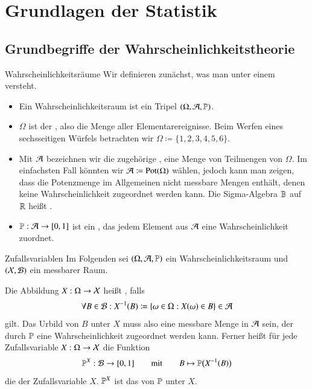 \section{Grundlagen der Statistik}

\divider

\subsection{Grundbegriffe der Wahrscheinlichkeitstheorie}

\begin{frame}{Wahrscheinlichkeitsräume}{}
	Wir definieren zunächst, was man unter einem  versteht.
	\begin{itemize}
		\item Ein Wahrscheinlichkeitsraum ist ein Tripel $(\Omega, \mathcal{A}, \mathbb{P})$.
		\item $\Omega$ ist der , also die Menge aller Elementarereignisse.
			Beim Werfen eines sechsseitigen Würfels betrachten wir $\Omega \coloneqq \{ 1, 2, 3, 4, 5, 6 \}$.
		\item Mit $\mathcal{A}$ bezeichnen wir die zugehörige , eine Menge von Teilmengen von $\Omega$.
			Im einfachsten Fall könnten wir $\mathcal{A} \coloneqq \text{Pot}(\Omega)$ wählen, jedoch kann man zeigen,
			dass die Potenzmenge im Allgemeinen nicht messbare Mengen enthält,
			denen keine Wahrscheinlichkeit zugeordnet werden kann. Die Sigma-Algebra $\mathbb{B}$ auf $\mathbb{R}$ heißt
			.
		\item $\mathbb{P} : \mathcal{A} \rightarrow [0, 1]$ ist ein ,
			das jedem Element aus $\mathcal{A}$ eine Wahrscheinlichkeit zuordnet.
	\end{itemize}
\end{frame}


\begin{frame}{Zufallsvariablen}{}
	Im Folgenden sei $(\Omega, \mathcal{A}, \mathbb{P})$ ein Wahrscheinlichkeitsraum und $(\mathcal{X}, \mathcal{B})$ ein messbarer Raum.
	
	\begin{mydef}
		Die Abbildung $X : \Omega \rightarrow \mathcal{X}$ heißt , falls
		\begin{equation*}
			\forall B \in \mathcal{B} : X^{-1}(B) \coloneqq \{ \omega \in \Omega : X(\omega) \in B \} \in \mathcal{A}
		\end{equation*}
		gilt. Das Urbild von $B$ unter $X$ muss also eine messbare Menge in $\mathcal{A}$ sein,
		der durch $\mathbb{P}$ eine Wahrscheinlichkeit zugeordnet werden kann.
		Ferner heißt für jede Zufallsvariable $X : \Omega \rightarrow \mathcal{X}$ die Funktion
		\begin{equation*}
			\mathbb{P}^X : \mathcal{B} \rightarrow [0, 1] \qquad\text{mit}\qquad B \mapsto \mathbb{P}\bigl( X^{-1}(B) \bigr)
		\end{equation*}
		die  der Zufallsvariable $X$. $\mathbb{P}^X$ ist das  von $\mathbb{P}$ unter $X$.
	\end{mydef}
\end{frame}


